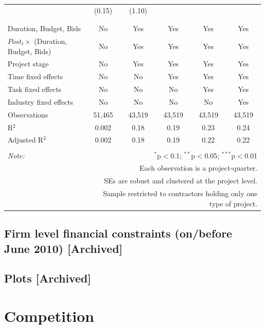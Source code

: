 \documentclass[
]{article}
\begin{document}
\begin{table}[H]
\begin{tabular}{@{\extracolsep{-2pt}}lccccc}
  & (0.15) & (1.10) &  &  &  \\ 
  & & & & & \\ 
\hline \\[-1.8ex] 
Duration, Budget, Bids & No & Yes & Yes & Yes & Yes \\ 
$Post_t \times $  (Duration, Budget, Bids) & No & Yes & Yes & Yes & Yes \\ 
Project stage & No & Yes & Yes & Yes & Yes \\ 
Time fixed effects & No & No & Yes & Yes & Yes \\ 
Task fixed effects & No & No & No & Yes & Yes \\ 
Industry fixed effects & No & No & No & No & Yes \\ 
Observations & 51,465 & 43,519 & 43,519 & 43,519 & 43,519 \\ 
R$^{2}$ & 0.002 & 0.18 & 0.19 & 0.23 & 0.24 \\ 
Adjusted R$^{2}$ & 0.002 & 0.18 & 0.19 & 0.22 & 0.22 \\ 
\hline 
\hline \\[-1.8ex] 
\textit{Note:}  & \multicolumn{5}{r}{$^{*}$p$<$0.1; $^{**}$p$<$0.05; $^{***}$p$<$0.01} \\ 
 & \multicolumn{5}{r}{Each observation is a project-quarter.} \\ 
 & \multicolumn{5}{r}{SEs are robust and clustered at the project level.} \\ 
 & \multicolumn{5}{r}{Sample restricted to contractors holding only one type of project.} \\ 
\end{tabular} 
\end{table}

\hypertarget{firm-level-financial-constraints-onbefore-june-2010-archived}{%
\subsection{Firm level financial constraints (on/before June 2010)
{[}Archived{]}}\label{firm-level-financial-constraints-onbefore-june-2010-archived}}

\hypertarget{plots-archived}{%
\subsection{Plots {[}Archived{]}}\label{plots-archived}}

\hypertarget{competition}{%
\section{Competition}\label{competition}}
\end{document}
